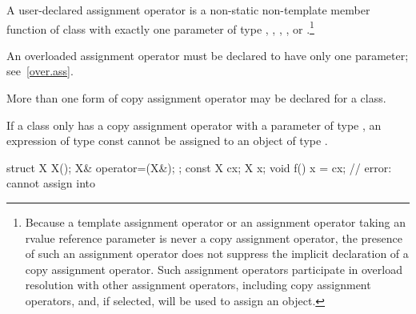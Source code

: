 \pnum
{}%
%
%
%
%
%
%
A user-declared  assignment operator  is a
non-static non-template member function of class  with exactly one
parameter of type , , ,
, or .\footnote{Because
a template assignment operator or an assignment operator
taking an rvalue reference parameter is never a copy assignment operator,
the presence of such an assignment operator does not suppress the
implicit declaration of a copy assignment operator. Such assignment operators
participate in overload resolution with other assignment operators, including
copy assignment operators, and, if selected, will be used to assign an object.}
\begin{note}
An overloaded assignment operator must be declared to have only one parameter;
see~\ref{over.ass}.
\end{note}
\begin{note}
More than one form of copy assignment operator may be declared for a class.
\end{note}
\begin{note}
If a class
only has a copy assignment operator with a parameter of type
,
an expression of type const
cannot be assigned to an object of type
.
\begin{example}
\begin{codeblock}
struct X {
  X();
  X& operator=(X&);
};
const X cx;
X x;
void f() {
  x = cx;           // error:  cannot assign  into 
}
\end{codeblock}
\end{example}
\end{note}

